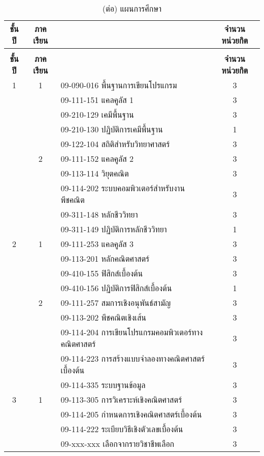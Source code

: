 \begin{longtable}{|c|c|>{\raggedright}p{}|c|}
	\caption{แผนการศึกษา}
	\label{table:Planyear}
	\\
	\hline
	{\bf ชั้นปี}&{\bf ภาคเรียน}&\multicolumn{1}{c|}{{\bf รายวิชา}}&{\bf จำนวนหน่วยกิต}\\
	\hline
	\endfirsthead
	
	\caption{(ต่อ) แผนการศึกษา}
	\\
	\hline
	{\bf ชั้นปี}&{\bf ภาคเรียน}&\multicolumn{1}{c|}{{\bf รายวิชา}}&{\bf จำนวนหน่วยกิต}\\
	\hline
	\endhead
	
	\hline
	\endfoot
	
	
	1&1&09-090-016	พื้นฐานการเขียนโปรแกรม	&	3\\
	&&09-111-151	แคลคูลัส 1			&3\\
	&&09-210-129	เคมีพื้นฐาน			&3\\
	&&09-210-130	ปฏิบัติการเคมีพื้นฐาน	&1\\
	&&09-122-104	สถิติสำหรับวิทยาศาสตร์	&3\\
	\cline{2-4}
	&2&09-111-152	แคลคูลัส 2	&3\\
	&&09-113-114	วิยุตคณิต	&3\\
	&&09-114-202	ระบบคอมพิวเตอร์สำหรับงานพีชคณิต	&3\\
	&&09-311-148	หลักชีววิทยา	&3\\
	&&09-311-149	ปฏิบัติการหลักชีววิทยา	&1\\
	\hline
	2&1&09-111-253	แคลคูลัส 3	&3\\
	&&09-113-201	หลักคณิตศาสตร์	&3\\
	&&09-410-155	ฟิสิกส์เบื้องต้น	&3\\
	&&09-410-156	ปฏิบัติการฟิสิกส์เบื้องต้น	&1\\
	\cline{2-4}
	&2&09-111-257	สมการเชิงอนุพันธ์สามัญ&3\\
	&&09-113-202	พีชคณิตเชิงเส้น&3\\
	&&09-114-204	การเขียนโปรแกรมคอมพิวเตอร์\newline ทางคณิตศาสตร์&3\\
	&&09-114-223	การสร้างแบบจำลองทางคณิตศาสตร์เบื้องต้น&3\\
	&&09-114-335	ระบบฐานข้อมูล&3\\
	\hline
	3&1&09-113-305	การวิเคราะห์เชิงคณิตศาสตร์&3\\
	&&09-114-205	กำหนดการเชิงคณิตศาสตร์เบื้องต้น&3\\
	&&09-114-222	ระเบียบวิธีเชิงตัวเลขเบื้องต้น&3\\
	&&09-xxx-xxx	เลือกจากรายวิชาชีพเลือก&3\\

\end{longtable}
